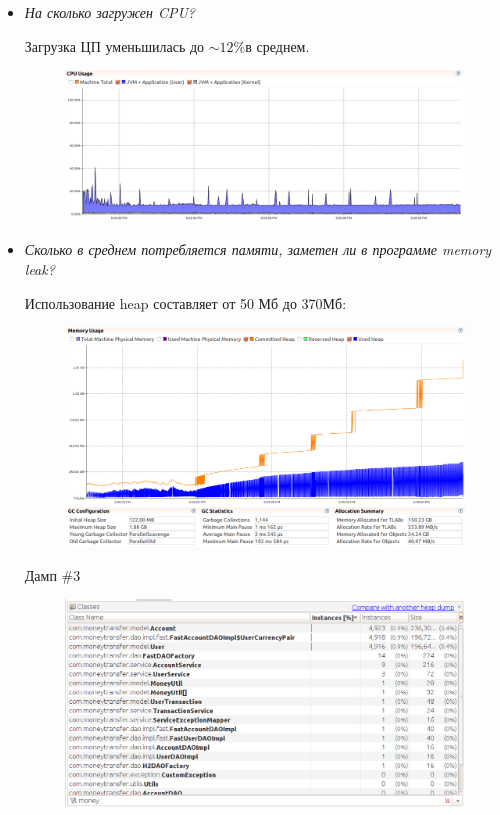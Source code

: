 \documentclass{article}
\begin{document}
\begin{itemize}
	
	\item \textit{На сколько загружен CPU?}
	
	Загрузка ЦП уменьшилась до $ \sim12\%  $в среднем.
	\begin{figure}[h!] %
		\centering
		\includegraphics[width=0.95\linewidth]{img/stage_2/cpu.png}
		
		\label{fig:cpu2}
	\end{figure}
	
	\item \textit{Сколько в среднем потребляется памяти, заметен ли в программе memory leak?}
	
	Использование heap составляет от 50 Мб до 370Мб:
	\begin{figure}[h!] %
		\centering
		\includegraphics[width=0.95\linewidth]{img/stage_2/memory.png}
		\label{fig:mem2}
	\end{figure}
	\newpage
	
	Дамп \#3
	\begin{figure}[h!] %
		\centering
		\includegraphics[width=0.75\linewidth]{img/stage_2/dump3.png}
		\label{fig:dmp32}
	\end{figure}
	

\end{itemize}
\end{document}
